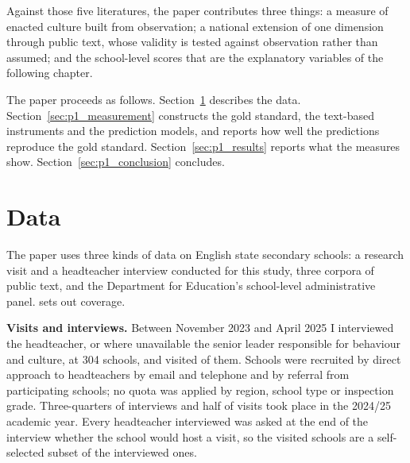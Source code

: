 Against those five literatures, the paper contributes three things: a measure
of enacted culture built from observation; a national extension of one
dimension through public text, whose validity is tested against observation
rather than assumed; and the school-level scores that are the explanatory
variables of the following chapter.

The paper proceeds as follows. Section~\ref{sec:p1_data} describes the data.
Section~\ref{sec:p1_measurement} constructs the gold standard, the text-based
instruments and the prediction models, and reports how well the predictions
reproduce the gold standard. Section~\ref{sec:p1_results} reports what the
measures show. Section~\ref{sec:p1_conclusion} concludes.

\section{Data}
\label{sec:p1_data}

The paper uses three kinds of data on English state secondary schools: a
research visit and a headteacher interview conducted for this study, three
corpora of public text, and the Department for Education's school-level
administrative panel.  sets out coverage.

\textbf{Visits and interviews.} Between November 2023 and April 2025 I
interviewed the headteacher, or where unavailable the senior leader
responsible for behaviour and culture, at 304 schools, and visited
\NTierOne{} of them. Schools were recruited by direct approach to
headteachers by email and telephone and by referral from participating
schools; no quota was applied by region, school type or inspection grade.
Three-quarters of interviews and half of visits took place in the 2024/25
academic year. Every headteacher interviewed was asked at the end of the
interview whether the school would host a visit, so the visited schools are a
self-selected subset of the interviewed ones.

